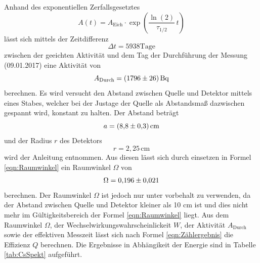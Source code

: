 Anhand des exponentiellen Zerfallsgesetztes
\begin{equation}
  A(t) = A_\text{Eich} \cdot \exp \left(\frac{\ln(2)}{\tau_{1/2}} \, t \right)
  \label{eqn:zerfG}
\end{equation}
lässt sich mittels der Zeitdifferenz
\begin{equation}
  \Delta t = 5938 \text{Tage}
\end{equation}
zwischen der geeichten Aktivität und dem Tag der Durchführung der Messung (09.01.2017) eine Aktivität von
\begin{equation}
  A_\text{Durch} = (\num{1796 +- 26}) \, \text{Bq}
  \label{eqn:AktEEu}
\end{equation}
berechnen. Es wird versucht den Abstand zwischen Quelle und Detektor mittels eines Stabes, welcher bei der Justage der Quelle als Abstandsmaß dazwischen gespannt wird, konstant zu halten. Der Abstand beträgt
\begin{equation}
  a = (\num{8,8 +-0,3}) \, \text{cm}
\end{equation}
und der Radius $r$ des Detektors
\begin{equation}
  r = 2,25 \, \text{cm}
\end{equation}
wird der Anleitung \cite{V18} entnommen. Aus diesen lässt sich durch einsetzen in Formel \ref{eqn:Raumwinkel} ein Raumwinkel $\Omega$ von
\begin{equation}
  \Omega = \num{0,196 +- 0,021}
  \label{eqn:Raum}
\end{equation}
berechnen. Der Raumwinkel $\Omega$ ist jedoch nur unter vorbehalt zu verwenden, da der Abstand zwischen Quelle und Detektor kleiner als 10 cm ist und dies nicht mehr im Gültigkeitsbereich der Formel \ref{eqn:Raumwinkel} liegt. Aus dem Raumwinkel $\Omega$, der Wechselwirkungswahrscheinlickeit $W$, der Aktivität $A_\text{Durch}$ sowie der effektiven Messzeit lässt sich nach Formel \ref{eqn:Zählergebnis} die Effizienz $Q$ berechnen. Die Ergebnisse in Abhängikeit der Energie sind in Tabelle \ref{tab:CsSpekt} aufgeführt.
